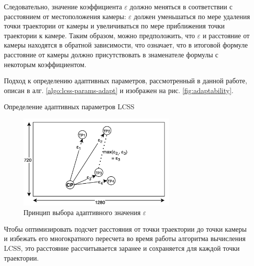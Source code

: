 Следовательно, значение коэффициента $\varepsilon$ должно меняться в соответствии с расстоянием от местоположения камеры: $\varepsilon$ должен уменьшаться по мере удаления точки траектории от камеры и увеличиваться по мере приближения точки траектории к камере. Таким образом, можно предположить, что $\varepsilon$ и расстояние от камеры находятся в обратной зависимости, что означает, что в итоговой формуле расстояние от камеры должно присутствовать в знаменателе формулы с некоторым коэффициентом.

Подход к определению адаптивных параметров, рассмотренный в данной работе, описан в алг. \ref{algo:lcss-params-adapt} и изображен на рис. \ref{fig:adaptability}.

\begin{algorithm}[!htb]
	\caption{Определение адаптивных параметров LCSS}
	\label{algo:lcss-params-adapt}
	\SetAlgoLined
\end{algorithm}

\begin{figure}[!htb]
	\centering{}
	\includegraphics[width=0.7\textwidth]{images/adaptivity.png}
	\caption{Принцип выбора адаптивного значения $\varepsilon$}
	\label{fig:adaptivity}
\end{figure}

Чтобы оптимизировать подсчет расстояния от точки траектории до точки камеры и избежать его многократного пересчета во время работы алгоритма вычисления LCSS, это расстояние рассчитывается заранее и сохраняется для каждой точки траектории.

